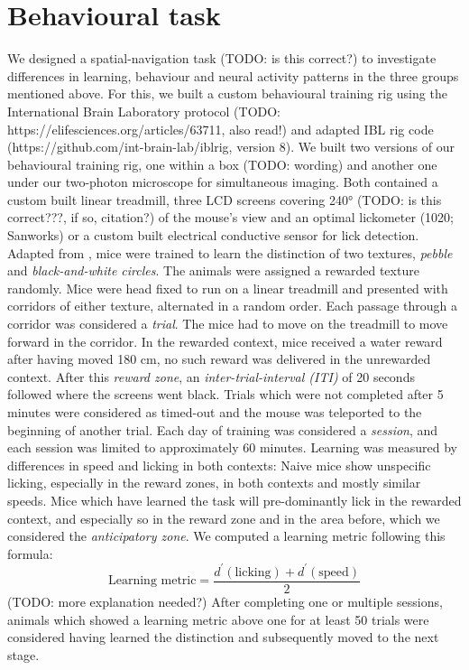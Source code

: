 \section{Behavioural task}
We designed a spatial-navigation task (TODO: is this correct?) to investigate differences in learning, behaviour and neural activity patterns in the three groups mentioned above.
For this, we built a custom behavioural training rig using the International Brain Laboratory protocol (TODO: https://elifesciences.org/articles/63711, also read!) and adapted IBL rig code (https://github.com/int-brain-lab/iblrig, version 8).
We built two versions of our behavioural training rig, one within a box (TODO: wording) and another one under our two-photon microscope for simultaneous imaging.
Both contained a custom built linear treadmill, three LCD screens covering 240° (TODO: is this correct???, if so, citation?) of the mouse's view and an optimal lickometer (1020; Sanworks) or a custom built electrical conductive sensor for lick detection.
Adapted from \parencite{Sun2021}, mice were trained to learn the distinction of two textures, \textit{pebble} and \textit{black-and-white circles}. The animals were assigned a rewarded texture randomly.  Mice were head fixed to run on a linear treadmill and presented with corridors of either texture, alternated in a random order. Each passage through a corridor was considered a \textit{trial}. The mice had to move on the treadmill to move forward in the corridor. In the rewarded context, mice received a water reward after having moved 180 cm, no such reward was delivered in the unrewarded context. After this \textit{reward zone}, an \textit{inter-trial-interval (ITI)} of 20 seconds followed where the screens went black. Trials which were not completed after 5 minutes were considered as timed-out and the mouse was teleported to the beginning of another trial. Each day of training was considered a \textit{session}, and each session was limited to approximately 60 minutes.
Learning was measured by differences in speed and licking in both contexts: Naive mice show unspecific licking, especially in the reward zones, in both contexts and mostly similar speeds. Mice which have learned the task will pre-dominantly lick in the rewarded context, and especially so in the reward zone and in the area before, which we considered the \textit{anticipatory zone}.
We computed a learning metric following this formula:
\begin{equation}
\text{Learning metric} = \frac{d^{\prime}(\text{licking}) + d^{\prime}(\text{speed})}{2}
\end{equation}
(TODO: more explanation needed?)
After completing one or multiple sessions, animals which showed a learning metric above one for at least 50 trials were considered having learned the distinction and subsequently moved to the next stage.

